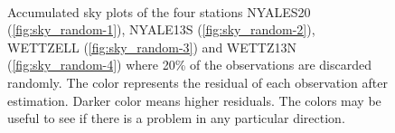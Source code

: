 \documentclass[twoside=semi,fontsize=12pt,paper=a4,titlepage=on]{kv_article}
\begin{document}
\begin{figure}
	 \\
    \caption{Accumulated sky plots of the four stations NYALES20 (\ref{fig:sky_random-1}), NYALE13S (\ref{fig:sky_random-2}), WETTZELL (\ref{fig:sky_random-3}) and WETTZ13N (\ref{fig:sky_random-4})
     where 20\% of the
    observations are discarded randomly. The color represents the residual of each observation after estimation. Darker color means higher residuals. The colors may be useful to see if there is a problem in any particular direction.}
	\label{fig:sky_random}
\end{figure}



\end{document}
